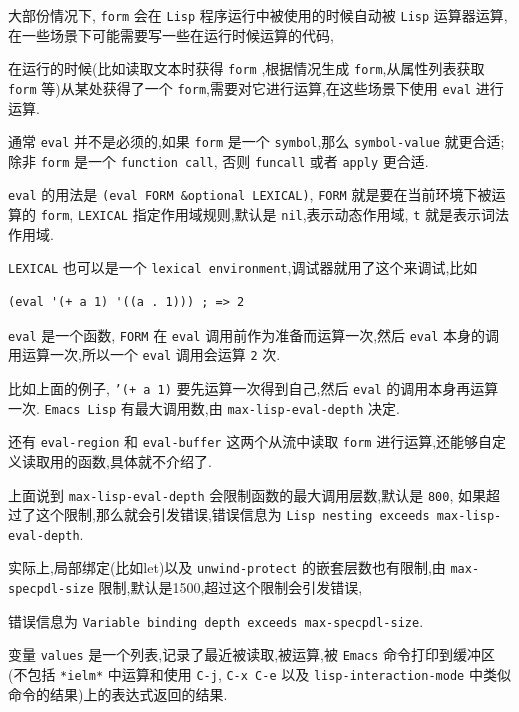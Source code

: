 \documentclass[11pt]{article}
\begin{document}
大部份情况下, \texttt{form} 会在 \texttt{Lisp} 程序运行中被使用的时候自动被 \texttt{Lisp} 运算器运算,在一些场景下可能需要写一些在运行时候运算的代码,

在运行的时候(比如读取文本时获得 \texttt{form} ,根据情况生成 \texttt{form},从属性列表获取 \texttt{form} 等)从某处获得了一个 \texttt{form},需要对它进行运算,在这些场景下使用 \texttt{eval} 进行运算.

通常 \texttt{eval} 并不是必须的,如果 \texttt{form} 是一个 \texttt{symbol},那么 \texttt{symbol-value} 就更合适;除非 \texttt{form} 是一个 \texttt{function call}, 否则 \texttt{funcall} 或者 \texttt{apply} 更合适.

\texttt{eval} 的用法是 \texttt{(eval FORM \&optional LEXICAL)}, \texttt{FORM} 就是要在当前环境下被运算的 \texttt{form}, \texttt{LEXICAL} 指定作用域规则,默认是 \texttt{nil},表示动态作用域, \texttt{t} 就是表示词法作用域.

\texttt{LEXICAL} 也可以是一个 \texttt{lexical environment},调试器就用了这个来调试,比如

\begin{verbatim}
(eval '(+ a 1) '((a . 1))) ; => 2
\end{verbatim}

\texttt{eval} 是一个函数, \texttt{FORM} 在 \texttt{eval} 调用前作为准备而运算一次,然后 \texttt{eval} 本身的调用运算一次,所以一个 \texttt{eval} 调用会运算 \texttt{2} 次.

比如上面的例子, \texttt{'(+ a 1)} 要先运算一次得到自己,然后 \texttt{eval} 的调用本身再运算一次. \texttt{Emacs Lisp} 有最大调用数,由 \texttt{max-lisp-eval-depth} 决定.

还有 \texttt{eval-region} 和 \texttt{eval-buffer} 这两个从流中读取 \texttt{form} 进行运算,还能够自定义读取用的函数,具体就不介绍了.

上面说到 \texttt{max-lisp-eval-depth} 会限制函数的最大调用层数,默认是 \texttt{800}, 如果超过了这个限制,那么就会引发错误,错误信息为 \texttt{Lisp nesting exceeds max-lisp-eval-depth}.

实际上,局部绑定(比如let)以及 \texttt{unwind-protect} 的嵌套层数也有限制,由 \texttt{max-specpdl-size} 限制,默认是1500,超过这个限制会引发错误,

错误信息为 \texttt{Variable binding depth exceeds max-specpdl-size}.

变量 \texttt{values} 是一个列表,记录了最近被读取,被运算,被 \texttt{Emacs} 命令打印到缓冲区(不包括 \texttt{*ielm*} 中运算和使用 \texttt{C-j}, \texttt{C-x C-e} 以及 \texttt{lisp-interaction-mode} 中类似命令的结果)上的表达式返回的结果.
\end{document}
